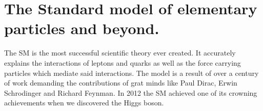 \chapter{The Standard model of elementary particles and beyond.}

The \ac{SM} is the most successful scientific theory ever
created. It accurately explains the interactions of leptons and quarks as well as the force
carrying particles which mediate said interactions. The model is a result of over a century of work
demanding the contributions of grat minds like Paul Dirac, Erwin Schrodinger and Richard Feynman.
In 2012 the SM achieved one of its crowning achievements when we discovered the Higgs boson. 